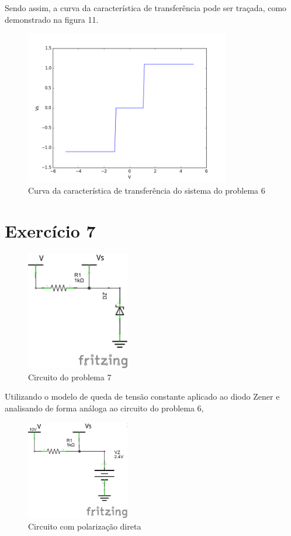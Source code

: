 \documentclass[12pt, a4paper, twoside]{article}
\begin{document}
Sendo assim, a curva da característica de transferência pode ser traçada, como
demonstrado na figura 11.
\begin{figure}[H]
    \centering
    \includegraphics[width=0.8\textwidth]{figs/rel3/ex6.png}
    \caption{Curva da característica de transferência do sistema do problema 6}
\end{figure}

\section{Exercício 7}

\begin{figure}[H]
    \centering
    \includegraphics[width=0.4\textwidth]{figs/rel3/c4.png}
    \caption{Circuito do problema 7}
\end{figure}

Utilizando o modelo de queda de tensão constante aplicado ao diodo Zener e
analisando de forma análoga ao circuito do problema 6,

\begin{figure}[H]
    \centering
    \includegraphics[width=0.4\textwidth]{figs/rel3/c4-1.png}
    \caption{Circuito com polarização direta}
\end{figure}
\end{document}

